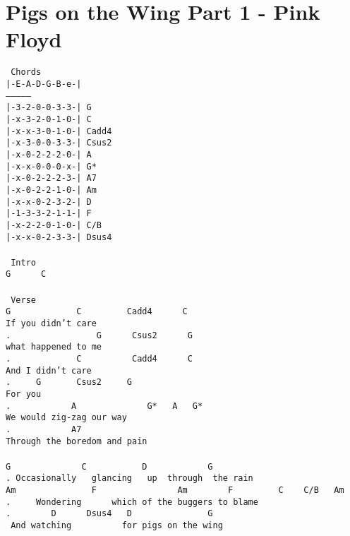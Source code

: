 \newpage
\section{Pigs on the Wing Part 1 - Pink Floyd}
\label{Pigs on the Wing Part 1 - Pink Floyd}
\texttt{\lbrack\ Chords\rbrack\\
|-E-A-D-G-B-e-|\\
---------------\\
|-3-2-0-0-3-3-|\ G\\
|-x-3-2-0-1-0-|\ C\\
|-x-x-3-0-1-0-|\ Cadd4\\
|-x-3-0-0-3-3-|\ Csus2\\
|-x-0-2-2-2-0-|\ A\\
|-x-x-0-0-0-x-|\ G*\\
|-x-0-2-2-2-3-|\ A7\\
|-x-0-2-2-1-0-|\ Am\\
|-x-x-0-2-3-2-|\ D\\
|-1-3-3-2-1-1-|\ F\\
|-x-2-2-0-1-0-|\ C/B\\
|-x-x-0-2-3-3-|\ Dsus4\\
\\
\lbrack\ Intro\rbrack\\
G\ \ \ \ \ \ C\\
\\
\lbrack\ Verse\rbrack\\
G\ \ \ \ \ \ \ \ \ \ \ \ \ C\ \ \ \ \ \ \ \ \ Cadd4\ \ \ \ \ \ C\\
If\ you\ didn't\ care\\
. \ \ \ \ \ \ \ \ \ \ \ \ \ \ \ \ G\ \ \ \ \ \ Csus2\ \ \ \ \ \ G\\
what\ happened\ to\ me\\
. \ \ \ \ \ \ \ \ \ \ \ \ C\ \ \ \ \ \ \ \ \ \ Cadd4\ \ \ \ \ \ C\\
And\ I\ didn't\ care\\
. \ \ \ \ G\ \ \ \ \ \ \ Csus2\ \ \ \ \ G\\
For\ you\\
. \ \ \ \ \ \ \ \ \ \ \ A\ \ \ \ \ \ \ \ \ \ \ \ \ \ G*\ \ \ A\ \ \ G*\\
We\ would\ zig-zag\ our\ way\\
. \ \ \ \ \ \ \ \ \ \ \ A7\\
Through\ the\ boredom\ and\ pain\\
\\
G\ \ \ \ \ \ \ \ \ \ \ \ \ \ C\ \ \ \ \ \ \ \ \ \ \ D\ \ \ \ \ \ \ \ \ \ \ \ G\\
. Occasionally\ \ \ glancing\ \ \ up\ \ through\ \ the\ rain\\
Am\ \ \ \ \ \ \ \ \ \ \ \ \ \ \ F\ \ \ \ \ \ \ \ \ \ \ \ \ \ \ \ Am\ \ \ \ \ \ \ \ F\ \ \ \ \ \ \ \ \ C\ \ \ \ C/B\ \ \ Am\\
. \ \ \ \ Wondering\ \ \ \ \ \ which\ of\ the\ buggers\ to\ blame\\
. \ \ \ \ \ \ \ D\ \ \ \ \ \ Dsus4\ \ \ D\ \ \ \ \ \ \ \ \ \ \ \ \ \ \ G\\
\ And\ watching\ \ \ \ \ \ \ \ \ \ for\ pigs\ on\ the\ wing\ }
